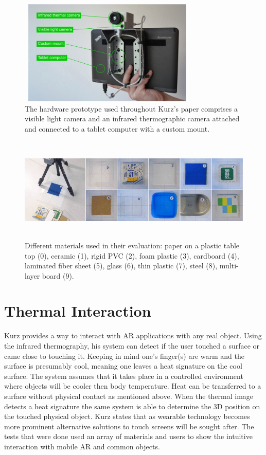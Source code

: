 \documentclass{sig-alternate}
\begin{document}
\begin{figure}
	\includegraphics[width=8.5cm, height=5cm]{Hardware2}
	\caption{The hardware prototype used throughout Kurz's paper comprises a visible light camera and an infrared thermographic camera attached and connected to a tablet computer with a custom mount. \cite{Thermal}}
	\label{fig:hardware}
\end{figure} 
\begin{figure}
	\includegraphics[width=18cm, height=5cm]{ThermalTesting}
	\caption{Different materials used in their evaluation: paper on a plastic table top (0), ceramic (1), rigid PVC (2), foam plastic (3), cardboard (4), laminated fiber sheet (5), glass (6), thin plastic (7), steel (8), multi-layer board (9). \cite{Thermal}}
	\label{fig:ThermalTest}
\end{figure}
\section{Thermal Interaction}
\label{sec:Thermal Interaction}

Kurz \cite{Thermal} provides a way to interact with AR applications with any real object. Using the infrared thermography, his system can detect if the user touched a surface or came close to touching it. Keeping in mind one's finger(s) are warm and the surface is presumably cool, meaning one leaves a heat signature on the cool surface. The system assumes that it takes place in a controlled environment where objects will be cooler then body temperature. Heat can be transferred to a surface without physical contact as mentioned above. When the thermal image detects a heat signature the same system is able to determine the 3D position on the touched physical object. Kurz \cite{Thermal} states that as wearable technology becomes more prominent alternative solutions to touch screens will be sought after. The tests that were done used an array of materials and users to show the intuitive interaction with mobile AR and common objects.
\end{document}
